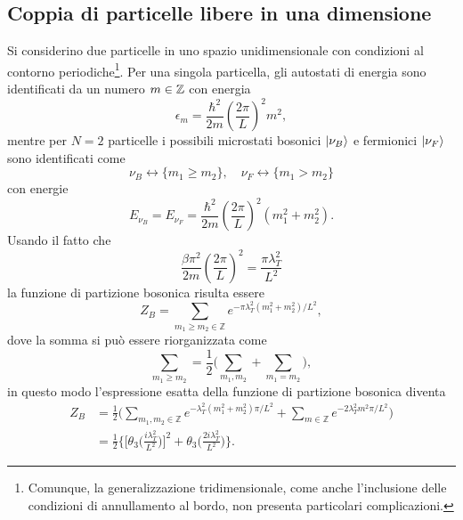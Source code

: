\subsection{Coppia di particelle libere in una dimensione}
Si considerino due particelle in uno spazio unidimensionale con condizioni al contorno periodiche\footnote{Comunque, la generalizzazione tridimensionale, come anche l'inclusione delle condizioni di annullamento al bordo, non presenta particolari complicazioni.}. Per una singola particella, gli autostati di energia sono identificati da un numero
$m \in \mathbb{Z}$ con energia
\begin{equation}
    \epsilon_m = \frac{\hbar^2}{2m} \left( \frac{2\pi}{L} \right)^2 m^2,
\end{equation}
mentre per $N = 2$ particelle i possibili microstati bosonici $\ket{\nu_B}$ e fermionici $\ket{\nu_F}$ sono
identificati come 
\begin{equation}
\nu_B \longleftrightarrow \{ m_1 \ge m_2 \}, \quad
\nu_F \longleftrightarrow \{ m_1 > m_2 \}
\end{equation}
con energie
\begin{equation}
E_{\nu_B} = E_{\nu_F}
= \frac{\hbar^2}{2m} \left( \frac{2\pi}{L} \right)^2 (m_1^2 + m_2^2).
\end{equation}
Usando il fatto che
\begin{equation}
    \frac{\beta \pi^2}{2m} \left( \frac{2\pi}{L} \right)^2 = \frac{\pi \lambda_T^2}{L^2}
\end{equation}
la funzione di partizione bosonica risulta essere
\begin{equation}
    Z_B = \sum_{m_1 \ge m_2 \in \mathbb{Z}}e^{-\pi \lambda_T^2(m_1^2 + m_2^2)/L^2},
\end{equation}
dove la somma si può essere riorganizzata come
\begin{equation}
    \sum_{m_1 \ge m_2} = \frac{1}{2}
\bigg( \sum_{m_1, m_2} + \sum_{m_1 = m_2} \bigg),
\end{equation}
in questo modo l'espressione esatta della funzione di partizione bosonica diventa
\begin{equation}
    \begin{split}
        Z_B &= \frac{1}{2} \bigg( \sum_{m_1,m_2 \in \mathbb{Z}} e^{-\lambda_T^2(m_1^2+m_2^2)\pi/L^2} + \sum_{m \in \mathbb{Z}} e^{-2\lambda_T^2 m^2\pi/L^2} \bigg) \\
        &= \frac{1}{2} \bigg\{\bigg[\theta_3\bigg(\frac{i\lambda_T^2}{L^2}\bigg)\bigg]^2 + \theta_3\bigg(\frac{2i\lambda_T^2}{L^2}\bigg)\bigg\}.
    \end{split}
\end{equation}
